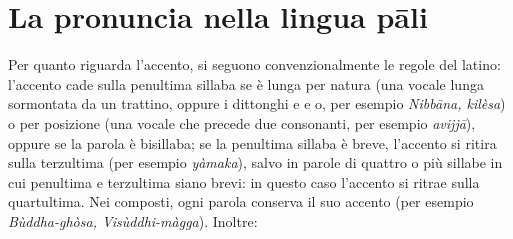 \chapter{La pronuncia nella lingua pāli}

Per quanto riguarda l’accento, si seguono convenzionalmente le regole
del latino: l’accento cade sulla penultima sillaba se è lunga per natura
(una vocale lunga sormontata da un trattino, oppure i dittonghi e e o,
per esempio \emph{Nibbāna, kilèsa}) o per posizione (una vocale che
precede due consonanti, per esempio \emph{avijjā}), oppure se la parola è
bisillaba; se la penultima sillaba è breve, l’accento si ritira sulla
terzultima (per esempio \emph{yàmaka}), salvo in parole di quattro o più
sillabe in cui penultima e terzultima siano brevi: in questo caso
l’accento si ritrae sulla quartultima. Nei composti, ogni parola
conserva il suo accento (per esempio \emph{Bùddha-ghòsa, Visùddhi-màgga}).
Inoltre:

\bigskip


